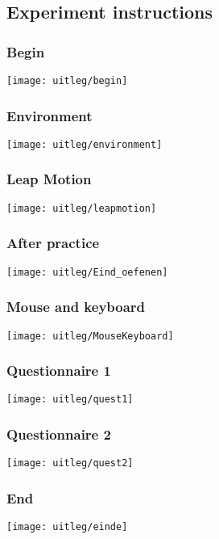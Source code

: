 \subsection{Experiment instructions}\label{app:instructions}

\subsubsection{Begin}
\texttt{[image: uitleg/begin]}

\subsubsection{Environment}
\texttt{[image: uitleg/environment]}

\subsubsection{Leap Motion}
\texttt{[image: uitleg/leapmotion]}

\subsubsection{After practice}
\texttt{[image: uitleg/Eind\_oefenen]}

\subsubsection{Mouse and keyboard}
\texttt{[image: uitleg/MouseKeyboard]}

\subsubsection{Questionnaire 1}
\texttt{[image: uitleg/quest1]}

\subsubsection{Questionnaire 2}
\texttt{[image: uitleg/quest2]}

\subsubsection{End}
\texttt{[image: uitleg/einde]}
